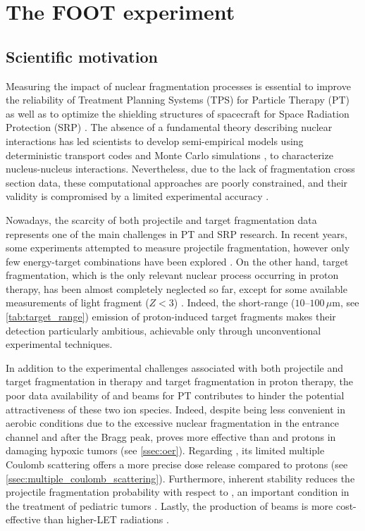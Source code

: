 \chapter{The FOOT experiment}\label{ch:foot_experiment}
\section{Scientific motivation}\label{sec:foot_motivation}
Measuring the impact of nuclear fragmentation processes is essential to improve the reliability of Treatment Planning Systems (TPS) for Particle Therapy (PT) as well as to optimize the shielding structures of spacecraft for Space Radiation Protection (SRP) \cite{measurement_impact_foot}. The absence of a fundamental theory describing nuclear interactions has led scientists to develop semi-empirical models using deterministic transport codes and Monte Carlo simulations \cite{Kramer2010,Sommerer_2006,Sato2009-db,Bohlen2010-em,Bolst2017-db}, to characterize nucleus-nucleus interactions. Nevertheless, due to the lack of fragmentation cross section data, these computational approaches are poorly constrained, and their validity is compromised by a limited experimental accuracy \cite{measurement_impact_foot}.

Nowadays, the scarcity of both projectile and target fragmentation data represents one of the main challenges in PT and SRP research. In recent years, some experiments attempted to measure  projectile fragmentation, however only few energy-target combinations have been explored \cite{DeNapoli_2012,PhysRevC.89.064615,PhysRevC.93.064601}. On the other hand, target fragmentation, which is the only relevant nuclear process occurring in proton therapy, has been almost completely neglected so far, except for some available measurements of light fragment ($Z<3$) \cite{foot_cdr}. Indeed, the short-range ($10$--$100\,\mu\mathrm{m}$, see \autoref{tab:target_range}) emission of proton-induced target fragments makes their detection particularly ambitious, achievable only through unconventional experimental techniques.

In addition to the experimental challenges associated with both projectile and target fragmentation in  therapy and target fragmentation in proton therapy, the poor data availability of  and  beams for PT \cite{Tommasino2016-af} contributes to hinder the potential attractiveness of these two ion species. Indeed, despite being less convenient in aerobic conditions due to the excessive nuclear fragmentation in the entrance channel and after the Bragg peak,  proves more effective than  and protons in damaging hypoxic tumors (see \autoref{ssec:oer}). Regarding , its limited multiple Coulomb scattering offers a more precise dose release compared to protons (see \autoref{ssec:multiple_coulomb_scattering}). Furthermore,  inherent stability reduces the projectile fragmentation probability with respect to , an important condition in the treatment of pediatric tumors \cite{articleIndelicato}. Lastly, the production of  beams is more cost-effective than higher-LET radiations \cite{Marafini_2017,Rovituso_2017}.
